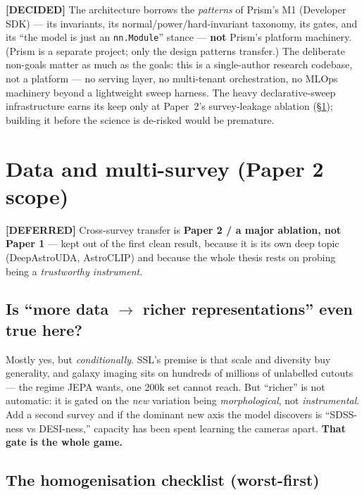 \documentclass[11pt,a4paper]{article}
\newcommand{\dec}{\textcolor{decided}{\sffamily\bfseries[DECIDED]}}
\newcommand{\dfr}{\textcolor{deferred}{\sffamily\bfseries[DEFERRED]}}
\begin{document}
\dec{} The architecture borrows the \emph{patterns} of Prism's M1 (Developer SDK) --- its
invariants, its normal/power/hard-invariant taxonomy, its gates, and its ``the model is just an
\texttt{nn.Module}'' stance --- \textbf{not} Prism's platform machinery. (Prism is a separate
project; only the design patterns transfer.) The deliberate non-goals matter as much as the
goals: this is a single-author research codebase, not a platform --- no serving layer, no
multi-tenant orchestration, no MLOps machinery beyond a lightweight sweep harness. The heavy
declarative-sweep infrastructure earns its keep only at Paper~2's survey-leakage ablation
(\S\ref{sec:data}); building it before the science is de-risked would be premature.

\section{Data and multi-survey (Paper 2 scope)}\label{sec:data}

\dfr{} Cross-survey transfer is \textbf{Paper 2 / a major ablation, not Paper 1} --- kept out
of the first clean result, because it is its own deep topic (DeepAstroUDA, AstroCLIP) and
because the whole thesis rests on probing being a \emph{trustworthy instrument}.

\subsection{Is ``more data $\rightarrow$ richer representations'' even true here?}

Mostly yes, but \emph{conditionally}. SSL's premise is that scale and diversity buy generality,
and galaxy imaging sits on hundreds of millions of unlabelled cutouts --- the regime JEPA wants,
one 200k set cannot reach. But ``richer'' is not automatic: it is gated on the \emph{new}
variation being \emph{morphological}, not \emph{instrumental}. Add a second survey and if the
dominant new axis the model discovers is ``SDSS-ness vs DESI-ness,'' capacity has been spent
learning the cameras apart. \textbf{That gate is the whole game.}

\subsection{The homogenisation checklist (worst-first)}
\end{document}
